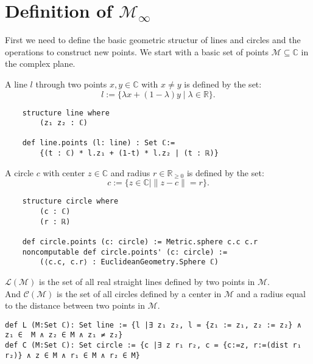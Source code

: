 \section{Definition of $\mathcal{M}_{\infty}$}
First we need to define the basic geometric structur of lines and circles and the operations to construct new points.
We start with a basic set of points $\mathcal{M} \subseteq \mathbb{C}$ in the complex plane. 

\begin{definition}[Line]
    \label{def:line}
    A line $l$ through two points $x,y\in\mathbb{C}$ with $x\ne y$ is defined by the set: $$l:=\{\lambda x+(1-\lambda)y\mid\lambda\in\mathbb{R}\}.$$
\end{definition}

\begin{lstlisting}
    structure line where
        (z₁ z₂ : ℂ)

    def line.points (l: line) : Set ℂ:= 
        {(t : ℂ) * l.z₁ + (1-t) * l.z₂ | (t : ℝ)}
\end{lstlisting}

\begin{definition}[Circle]
    \label{def:circle}
    A circle $c$ with center $z\in\mathbb{C}$ and radius $r\in\mathbb{R}_{\ge 0}$ is defined by the set: $$c:=\{z\in\mathbb{C} \mid\|z-c\|=r\}.$$
\end{definition}

\begin{lstlisting}
    structure circle where
        (c : ℂ)
        (r : ℝ)

    def circle.points (c: circle) := Metric.sphere c.c c.r
    noncomputable def circle.points' (c: circle) := 
        (⟨c.c, c.r⟩ : EuclideanGeometry.Sphere ℂ)
\end{lstlisting}


\begin{definition}
    \label{def:set_of_lines_and_circles}
    $\mathcal{L(M)}$ is the set of all real straight lines defined by two points in $\mathcal{M}$.\\
    And $\mathcal{C(M)}$ is the set of all circles defined by a center in $\mathcal{M}$ and a radius equal to the distance between two points in $\mathcal{M}$.
\end{definition}

\begin{lstlisting}
def L (M:Set ℂ): Set line := {l |∃ z₁ z₂, l = {z₁ := z₁, z₂ := z₂} ∧ z₁ ∈  M ∧ z₂ ∈ M ∧ z₁ ≠ z₂}
def C (M:Set ℂ): Set circle := {c |∃ z r₁ r₂, c = {c:=z, r:=(dist r₁ r₂)} ∧ z ∈ M ∧ r₁ ∈ M ∧ r₂ ∈ M}
\end{lstlisting}

